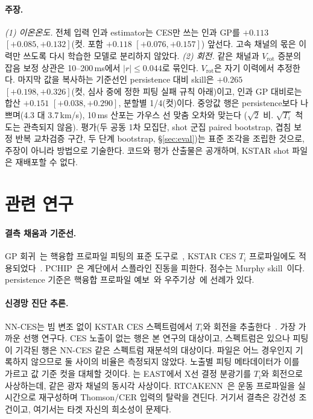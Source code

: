 \documentclass[10pt,twocolumn,letterpaper]{article}
\newcommand{\Ti}{\ensuremath{T_i}}
\newcommand{\Vrot}{\ensuremath{V_\mathrm{rot}}}
\begin{document}
\paragraph{주장.}
\emph{(1) 이온온도.} 전체 입력 인과 estimator는 CES만 쓰는 인과 GP를 $+0.113$
$[+0.085, +0.132]$(컷. 포함 $+0.118$ $[+0.076, +0.157]$) 앞선다. 고속 채널의 몫은 이력만
쓰도록 다시 학습한 모델로 분리하지 않았다.
\emph{(2) 회전.} 같은 채널과 \Vrot{} 증분의 잡음 보정 상관은 10--200\,ms에서
$|r| \leq 0.044$로 묶인다. \Vrot{}은 자기 이력에서 추정한다. 마지막 값을 복사하는 기준선인
persistence 대비 skill은 $+0.265$ $[+0.198, +0.326]$(컷, 심사 중에 정한 피팅 실패 규칙
아래)이고, 인과 GP 대비로는 합산 $+0.151$ $[+0.038, +0.290]$, 분할별 1/4(컷)이다. 중앙값
행은 persistence보다 나쁘며(4.3 대 3.7\,km/s), 10\,ms 산포는 가우스 선 맞춤 오차와 맞는다
($\sqrt2$ 비. $\sqrt{T_i}$ 척도는 관측되지 않음).
평가(두 공동 1차 모집단, shot 군집 paired bootstrap, 겹침 보정 반복 교차검증 구간, 두 단계
bootstrap, \S\ref{sec:eval})는 표준 조각을 조립한 것으로, 주장이 아니라 방법으로 기술한다.
코드와 평가 산출물은 공개하며, KSTAR shot 파일은 재배포할 수 없다.

\section{관련 연구}
\label{sec:related}

\paragraph{결측 채움과 기준선.} GP 회귀~\citep{rasmussen2006}는 핵융합 프로파일
피팅의 표준 도구로~\citep{chilenski2015,michoski2024}, KSTAR CES \Ti{} 프로파일에도
적용되었다~\citep{Kim2024KineticProfile}. PCHIP~\citep{fritsch1980}은 계단에서 스플라인
진동을 피한다. 점수는 Murphy skill~\citep{murphy1988}이다. persistence 기준은 핵융합
프로파일 예보~\citep{Abbate2025Combining}와 우주기상~\citep{Owens2013Persistence}에
선례가 있다.

\paragraph{신경망 진단 추론.} NN-CES는 빔 변조 없이 KSTAR CES 스펙트럼에서 \Ti{}와
회전을 추출한다~\citep{Lee2026NeuralNetworkbased}. 가장 가까운 선행 연구다.
CES 노출이 없는 행은 본 연구의 대상이고, 스펙트럼은 있으나 피팅이 기각된 행은 NN-CES 같은
스펙트럼 재분석의 대상이다. 파일은 어느 경우인지 기록하지 않으므로 둘 사이의 비율은 측정되지
않았다. 노출별 피팅 메타데이터가 이를 가르고 값 기준 컷을 대체할 것이다. \citet{Lin2024PredictionPlasma}는 EAST에서 X선 결정
분광기를 \Ti{}와 회전으로 사상하는데, 같은 광자 채널의 동시각 사상이다.
RTCAKENN~\citep{Shousha2023MachineLearningbased}은 운동 프로파일을 실시간으로 재구성하며
Thomson/CER 입력의 탈락을 견딘다. 거기서 결측은 강건성 조건이고, 여기서는 타겟 자신의
희소성이 문제다.
\end{document}
